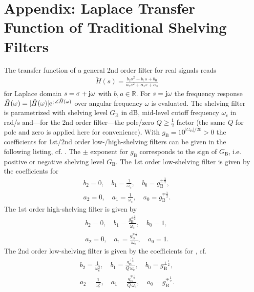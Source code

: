 \section*{Appendix: Laplace Transfer Function of Traditional Shelving Filters}
%
The transfer function of a general 2nd order filter for real signals
reads
%
\begin{align}
\label{eq:generalHbiquad}
\tilde{H}(s) = \frac{b_2 s^2 + b_1 s + b_0}{a_2 s^2 + a_1 s + a_0}
\end{align}
for Laplace domain $s = \sigma + \im \omega$ with $b, a\in\mathbb{R}$.
%
For $s = \im \omega$ the frequency response
$\tilde{H}(\omega)=|\tilde{H}(\omega)|\e^{\im \angle \tilde{H}(\omega)}$ over angular
frequency $\omega$ is evaluated.
%
%
%
\NewL
The shelving filter is parametrized with
shelving level $G_\mathrm{B}$ in dB,
mid-level cutoff frequency $\omega_c$ in rad/s
and---for the 2nd order filter---the pole/zero $Q\geq\frac{1}{2}$ factor
(the same $Q$ for pole and zero is applied here for convenience).
%
With $g_\mathrm{B} = 10^{|G_\mathrm{B}| / 20}>0$ the coefficients for 1st/2nd
order low-/high-shelving
filters can be given in the following listing, cf. \cite{Spors2019}.
%
The $\pm$ exponent for $g_\mathrm{B}$ corresponds to the sign of $G_\mathrm{B}$,
i.e. positive or negative shelving level $G_\mathrm{B}$.
%
%
%
\NewL
%
The 1st order low-shelving filter is given by the coefficients
for 
\begin{align}
b_2 = 0,\quad b_1 = \frac{1}{\omega_\mathrm{c}},\quad b_0 = g_\mathrm{B}^{\pm\frac{1}{2}},\\\nonumber
a_2 = 0,\quad a_1 = \frac{1}{\omega_\mathrm{c}},\quad a_0 = g_\mathrm{B}^{\mp\frac{1}{2}}.
\end{align}
%
The 1st order high-shelving filter is given by
\begin{align}
b_2 = 0,\quad b_1 = \frac{g_\mathrm{B}^{\pm\frac{1}{2}}}{\omega_\mathrm{c}},\quad b_0 = 1,\\\nonumber
a_2 = 0,\quad a_1 = \frac{g_\mathrm{B}^{\mp\frac{1}{2}}}{\omega_\mathrm{c}},\quad a_0 = 1.
\end{align}
%
The 2nd order low-shelving filter is given by the
coefficients for , cf. \cite[(15)]{Valimaki2016}
\begin{align}
\label{eq:LS2nd}
b_2 = \frac{1}{\omega_\mathrm{c}^2},\quad b_1 = \frac{g_\mathrm{B}^{\pm\frac{1}{4}}}{Q\,\omega_\mathrm{c}},\quad b_0 = g_\mathrm{B}^{\pm\frac{1}{2}},\\\nonumber
a_2 = \frac{1}{\omega_\mathrm{c}^2},\quad a_1 = \frac{g_\mathrm{B}^{\mp\frac{1}{4}}}{Q\,\omega_\mathrm{c}},\quad a_0 = g_\mathrm{B}^{\mp\frac{1}{2}}.
\end{align}
